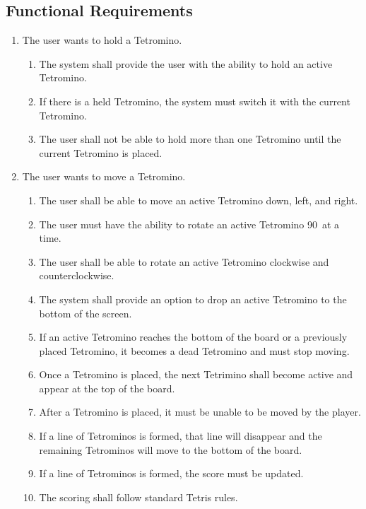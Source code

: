 \documentclass[12pt, titlepage]{article}
\begin{document}
\subsection{Functional Requirements}
\begin{enumerate}[{BE}1. ]

    \item The user wants to hold a Tetromino.
    \begin{enumerate}[{FR}1. ]
    \item The system shall provide the user with the ability to hold an active Tetromino.
    \item If there is a held Tetromino, the system must switch it with the current Tetromino.
    \item The user shall not be able to hold more than one Tetromino until the current Tetromino is placed.
    \end{enumerate}

    \item The user wants to move a Tetromino.
    \begin{enumerate}[{FR}1. ]
    \item The user shall be able to move an active Tetromino down, left, and right.
    \item The user must have the ability to rotate an active Tetromino 90\textdegree\ at a time.
    \item The user shall be able to rotate an active Tetromino clockwise and counterclockwise. 
    \item The system shall provide an option to drop an active Tetromino to the bottom of the screen.
    \item If an active Tetromino reaches the bottom of the board or a previously placed Tetromino, it becomes a dead Tetromino and must stop moving.
    \item Once a Tetromino is placed, the next Tetrimino shall become active and appear at the top of the board.
    \item After a Tetromino is placed, it must be unable to be moved by the player.
    \item If a line of Tetrominos is formed, that line will disappear and the remaining Tetrominos will move to the bottom of the board.
    \item If a line of Tetrominos is formed, the score must be updated.
    \item The scoring shall follow standard Tetris rules.\cite{tetris}
    \end{enumerate}
    

\end{enumerate}
\end{document}
